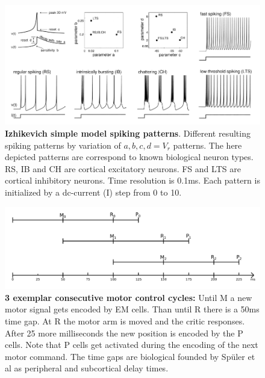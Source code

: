 \begin{figure}[tb]
	\centering
	\includegraphics[width=0.7\linewidth]{figures/ModelSebastian/SpikingPatterns}
	\caption[Izhikevich simple \cite{izhikevichSimpleModel} model spiking patterns]{\textbf{Izhikevich simple model \cite{izhikevichSimpleModel} spiking patterns}. Different resulting spiking patterns by variation of $a,b,c,d=V_r$ patterns. The here depicted patterns are correspond to known biological neuron types. RS, IB and CH are cortical excitatory neurons. FS and LTS are cortical inhibitory neurons. Time resolution is 0.1ms. Each pattern is initialized by a dc-current (I) step from 0 to 10. \cite{izhikevichSimpleModel}}  %
	\label{fig:spikingpatterns}
\end{figure}

\begin{figure}
	\centering
	\includegraphics[width=0.7\linewidth]{figures/ModelSebastian/timing}
	\caption[Motor Control cycles]{\textbf{3 exemplar consecutive motor control cycles:} Until M a new motor signal gets encoded by EM cells. Than until R there is a 50ms time gap. At R the motor arm is moved and the critic responses. After 25 more milliseconds the new position is encoded by the P cells. Note that P cells get activated during the encoding of the next motor command. The time gaps are biological founded by Spüler et al as peripheral and subcortical delay times.}
	\label{fig:timing}
\end{figure}

